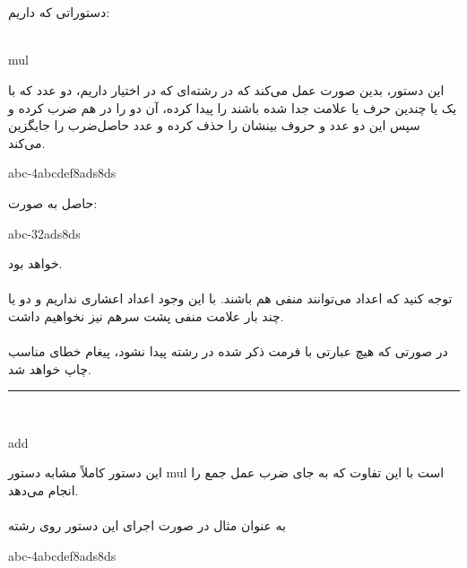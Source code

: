 \documentclass[]{article}
\begin{document}
\\\\
دستوراتی که داریم:\\\\
\begin{tcolorbox}[boxrule=0pt]
	\begin{latin}
  	  \large{
  	  	mul
		}
	\end{latin}
\end{tcolorbox}
این دستور، بدین صورت عمل می‌کند که در رشته‌ای که در اختیار داریم، دو عدد که با یک یا چندین حرف یا علامت جدا شده باشند را پیدا کرده، آن دو را در هم ضرب کرده و سپس این دو عدد و حروف بینشان را حذف کرده و عدد حاصل‌ضرب را جایگزین می‌کند.\\
\begin{tcolorbox}[boxrule=0pt]
	\begin{latin}
  	  \large{
  	  	abc-4abcdef8ads8ds
		}
	\end{latin}
\end{tcolorbox}
حاصل به صورت:\\
\begin{tcolorbox}[boxrule=0pt]
	\begin{latin}
  	  \large{
  	  	abc-32ads8ds
		}
	\end{latin}
\end{tcolorbox}
خواهد بود.\\\\
توجه کنید که اعداد می‌توانند منفی هم باشند. با این وجود اعداد اعشاری نداریم و دو یا چند بار علامت منفی پشت سرهم نیز نخواهیم داشت.\\\\
در صورتی که هیچ عبارتی با فرمت ذکر شده در رشته پیدا نشود، پیغام خطای مناسب چاپ خواهد شد.\\
\noindent\rule[0.5ex]{\linewidth}{1pt}\\
\begin{tcolorbox}[boxrule=0pt]
	\begin{latin}
  	  \large{
  	  	add
		}
	\end{latin}
\end{tcolorbox}
این دستور کاملاً مشابه دستور mul است با این تفاوت که به جای ضرب عمل جمع را انجام می‌دهد.\\\\
به عنوان مثال در صورت اجرای این دستور روی رشته\\
\begin{tcolorbox}[boxrule=0pt]
	\begin{latin}
  	  \large{
  	  	abc-4abcdef8ads8ds
		}
	\end{latin}
\end{tcolorbox}
\end{document}
